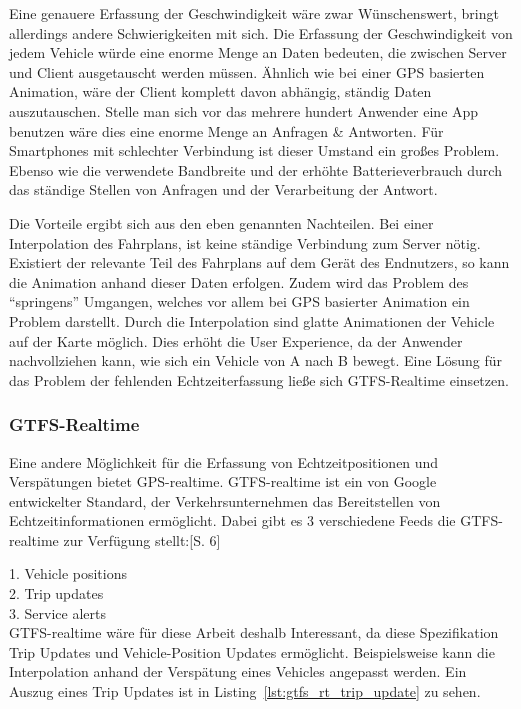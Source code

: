       Eine genauere Erfassung der Geschwindigkeit wäre zwar Wünschenswert, bringt allerdings andere Schwierigkeiten mit sich. Die Erfassung der Geschwindigkeit von jedem Vehicle würde eine enorme Menge an Daten bedeuten, die zwischen Server und Client ausgetauscht werden müssen. Ähnlich wie bei einer GPS basierten Animation, wäre der Client komplett davon abhängig, ständig Daten auszutauschen. Stelle man sich vor das mehrere hundert Anwender eine App benutzen wäre dies eine enorme Menge an Anfragen \& Antworten. Für Smartphones mit schlechter Verbindung ist dieser Umstand ein großes Problem. Ebenso wie die verwendete Bandbreite und der erhöhte Batterieverbrauch durch das ständige Stellen von Anfragen und der Verarbeitung der Antwort.

      Die Vorteile ergibt sich aus den eben genannten Nachteilen. Bei einer Interpolation des Fahrplans, ist keine ständige Verbindung zum Server nötig. Existiert der relevante Teil des Fahrplans auf dem Gerät des Endnutzers, so kann die Animation anhand dieser Daten erfolgen. Zudem wird das Problem des "`springens"' Umgangen, welches vor allem bei GPS basierter Animation ein Problem darstellt. Durch die Interpolation sind glatte Animationen der Vehicle auf der Karte möglich. Dies erhöht die User Experience, da der Anwender nachvollziehen kann, wie sich ein Vehicle von A nach B bewegt.
      Eine Lösung für das Problem der fehlenden Echtzeiterfassung ließe sich GTFS-Realtime einsetzen.
    
    
    \subsubsection{GTFS-Realtime}
    \label{ssub:gtfs_realtime}
      Eine andere Möglichkeit für die Erfassung von Echtzeitpositionen und Verspätungen bietet GPS-realtime. GTFS-realtime ist ein von Google entwickelter Standard, der Verkehrsunternehmen das Bereitstellen von Echtzeitinformationen ermöglicht. Dabei gibt es 3 verschiedene Feeds die GTFS-realtime zur Verfügung stellt:\parencite{zervaas_realtime}[S. 6]

      1. Vehicle positions\\
      2. Trip updates\\
      3. Service alerts\\

      GTFS-realtime wäre für diese Arbeit deshalb Interessant, da diese Spezifikation Trip Updates und Vehicle-Position Updates ermöglicht. Beispielsweise kann die Interpolation anhand der Verspätung eines Vehicles angepasst werden. Ein Auszug eines Trip Updates ist in Listing~\ref{lst:gtfs_rt_trip_update} zu sehen.

